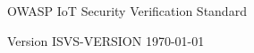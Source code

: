 \thispagestyle{empty} %

OWASP IoT Security Verification Standard


Version {{ISVS-VERSION}} \today
